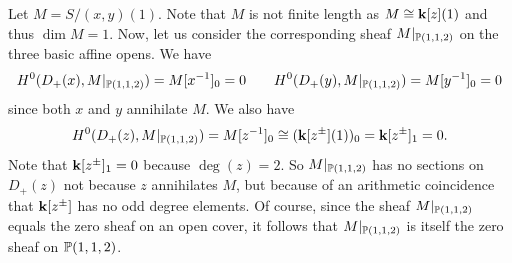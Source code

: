 \documentclass{amsart}
\begin{document}
%
%

\begin{example}\label{ex:oddP112}
  Let $M=S/(x,y)(1)$.  Note that $M$ is not finite length as $M\cong {\bf k}[z](1)$ and thus $\dim M = 1$.  Now, let us consider the corresponding sheaf $M|_{\mathbb P(1,1,2)}$ on the three basic affine opens.  We have
  \[
  H^0(D_+(x), M|_{\mathbb P(1,1,2)}) = M[x^{-1}]_0 =0 \qquad H^0(D_+(y), M|_{\mathbb P(1,1,2)}) = M[y^{-1}]_0 =0
  \]
  since both $x$ and $y$ annihilate $M$.  We also have
  \[
  H^0(D_+(z), M|_{\mathbb P(1,1,2)})= M[z^{-1}]_0 \cong ({\bf k}[z^{\pm}](1))_0 = {\bf k}[z^{\pm}]_1 = 0.
  \]
  Note that ${\bf k}[z^{\pm}]_1 = 0$ because $\deg(z)=2$.  So $M|_{\mathbb P(1,1,2)}$ has no sections on $D_+(z)$ not because $z$ annihilates $M$, but because of an arithmetic coincidence that ${\bf k}[z^{\pm}]$ has no odd degree elements.  Of course, since the sheaf $M|_{\mathbb P(1,1,2)}$ equals the zero sheaf on an open cover, it follows that $M|_{\mathbb P(1,1,2)}$ is itself the zero sheaf on $\mathbb P(1,1,2)$.
\end{example}
\end{document}
